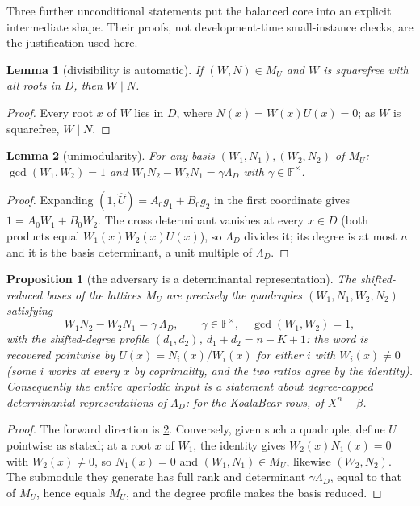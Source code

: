 \documentclass[11pt]{article}
\newtheorem{lemma}[lemma]{Lemma}
\newtheorem{proposition}[proposition]{Proposition}
\theoremstyle{definition}
\theoremstyle{remark}
\newcommand{\F}{\mathbb{F}}
\begin{document}
Three further unconditional statements put the balanced core into an explicit intermediate shape.  Their proofs, not development-time small-instance checks, are the justification used here.

\begin{lemma}[divisibility is automatic]\label{lem:capfp-autodiv}
If $(W,N)\in M_U$ and $W$ is squarefree with all roots in $D$, then $W\mid N$.
\end{lemma}

\begin{proof}
Every root $x$ of $W$ lies in $D$, where $N(x)=W(x)U(x)=0$; as $W$ is squarefree, $W\mid N$.
\end{proof}

\begin{lemma}[unimodularity]\label{lem:capfp-unimodular}
For any basis $(W_1,N_1),(W_2,N_2)$ of $M_U$: $\gcd(W_1,W_2)=1$ and $W_1N_2-W_2N_1=\gamma\Lambda_D$ with $\gamma\in\F^\times$.
\end{lemma}

\begin{proof}
Expanding $(1,\widehat U)=A_0g_1+B_0g_2$ in the first coordinate gives $1=A_0W_1+B_0W_2$.  The cross determinant vanishes at every $x\in D$ \textup(both products equal $W_1(x)W_2(x)U(x)$\textup), so $\Lambda_D$ divides it; its degree is at most $n$ and it is the basis determinant, a unit multiple of $\Lambda_D$.
\end{proof}

\begin{proposition}[the adversary is a determinantal representation]\label{prop:capfp-detrep}
The shifted-reduced bases of the lattices $M_U$ are precisely the quadruples
$(W_1,N_1,W_2,N_2)$ satisfying
\[
        W_1N_2-W_2N_1=\gamma\,\Lambda_D,\qquad\gamma\in\F^\times,\quad\gcd(W_1,W_2)=1,
\]
with the shifted-degree profile $(d_1,d_2)$, $d_1+d_2=n-K+1$: the word is recovered pointwise by $U(x)=N_i(x)/W_i(x)$ for either $i$ with $W_i(x)\ne0$ \textup(some $i$ works at every $x$ by coprimality, and the two ratios agree by the identity\textup).  Consequently the entire aperiodic input is a statement about degree-capped determinantal representations of $\Lambda_D$: for the KoalaBear rows, of $X^n-\beta$.
\end{proposition}

\begin{proof}
The forward direction is \cref{lem:capfp-unimodular}.  Conversely, given such a quadruple, define $U$ pointwise as stated; at a root $x$ of $W_1$, the identity gives $W_2(x)N_1(x)=0$ with $W_2(x)\ne0$, so $N_1(x)=0$ and $(W_1,N_1)\in M_U$, likewise $(W_2,N_2)$.  The submodule they generate has full rank and determinant $\gamma\Lambda_D$, equal to that of $M_U$, hence equals $M_U$, and the degree profile makes the basis reduced.
\end{proof}
\end{document}
